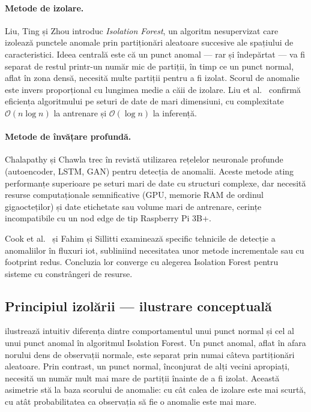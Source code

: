 \paragraph{Metode de izolare.} Liu, Ting și Zhou \cite{liu2008isolation} introduc
\emph{Isolation Forest}, un algoritm nesupervizat care izolează punctele anomale prin
partiționări aleatoare succesive ale spațiului de caracteristici. Ideea centrală este
că un punct anomal — rar și îndepărtat — va fi separat de restul printr-un număr mic
de partiții, în timp ce un punct normal, aflat în zona densă, necesită multe partiții
pentru a fi izolat. Scorul de anomalie este invers proporțional cu lungimea medie a
căii de izolare. Liu et al.\ \cite{liu2012isolationtkdd} confirmă eficiența algoritmului
pe seturi de date de mari dimensiuni, cu complexitate $\mathcal{O}(n \log n)$ la
antrenare și $\mathcal{O}(\log n)$ la inferență.

\paragraph{Metode de învățare profundă.} Chalapathy și Chawla \cite{chalapathy2019deepanomaly}
trec în revistă utilizarea rețelelor neuronale profunde (autoencoder, LSTM, GAN) pentru
detecția de anomalii. Aceste metode ating performanțe superioare pe seturi mari de date
cu structuri complexe, dar necesită resurse computaționale semnificative (GPU, memorie
RAM de ordinul gigaocteților) și date etichetate sau volume mari de antrenare, cerințe
incompatibile cu un nod edge de tip Raspberry Pi 3B+.

Cook et al.\ \cite{cook2020anomalyiot} și Fahim și Sillitti \cite{fahim2019anomaly}
examinează specific tehnicile de detecție a anomaliilor în fluxuri \gls{iot}, subliniind
necesitatea unor metode incrementale sau cu footprint redus. Concluzia lor converge cu
alegerea Isolation Forest pentru sisteme cu constrângeri de resurse.

\subsection{Principiul izolării — ilustrare conceptuală}

 ilustrează intuitiv diferența dintre comportamentul unui punct
normal și cel al unui punct anomal în algoritmul Isolation Forest. Un punct anomal,
aflat în afara norului dens de observații normale, este separat prin numai câteva
partiționări aleatoare. Prin contrast, un punct normal, înconjurat de alți vecini apropiați,
necesită un număr mult mai mare de partiții înainte de a fi izolat. Această asimetrie
stă la baza scorului de anomalie: cu cât calea de izolare este mai scurtă, cu atât
probabilitatea ca observația să fie o anomalie este mai mare.

